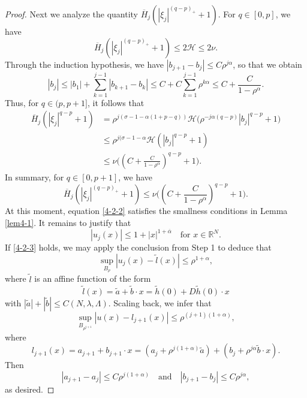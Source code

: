 \documentclass[11pt,reqno]{amsart}
\numberwithin{equation}{section}
\begin{document}
\begin{proof}
Next we analyze the quantity $\overline{H}_j(|\xi_j|^{(q-p)_+}+1)$. For $q\in[0,p]$, we have
$$
\overline{H}_j(|\xi_j|^{(q-p)_+}+1)\le2\mathcal{H}\le2\nu.
$$
Through the induction hypothesis, we have $|b_{j+1}-b_j|\le C\rho^{j\alpha}$, so that we obtain
$$
|b_j|\le |b_1|+\sum_{k=1}^{j-1}|b_{k+1}-b_k|\le C+C\sum_{k=1}^{j-1}\rho^{k\alpha}\le C+\frac{C}{1-\rho^\alpha}.
$$
Thus, for $q\in(p,p+1]$, it follows that
\begin{align*}
\overline{H}_j(|\xi_j|^{q-p}+1)&=\rho^{j(\sigma-1-\alpha(1+p-q))}\mathcal{H}\bigl(\rho^{-j\alpha(q-p)}|b_j|^{q-p}+1\bigr)\\
&\le\rho^{j(\sigma-1-\alpha}\mathcal{H}\left(|b_j|^{q-p}+1\right)\\
&\le\nu\biggl(\left(C+\frac{C}{1-\rho^\alpha}\right)^{q-p}+1\biggr).
\end{align*}
In summary, for $q\in[0,p+1]$, we have
$$
\overline{H}_j(|\xi_j|^{(q-p)_+}+1)\le\nu\biggl(\left(C+\frac{C}{1-\rho^\alpha}\right)^{q-p}+1\biggr).
$$
At this moment,  equation \eqref{4-2-2} satisfies the smallness conditions in Lemma \ref{lem4-1}. It remains to justify that
\begin{equation}
\label{4-2-3}
|u_j(x)|\le1+|x|^{1+\overline{\alpha}} \quad\text{for } x\in\mathbb{R}^N.
\end{equation}
If  \eqref{4-2-3} holds, we may apply the conclusion from Step 1 to deduce that
$$
\sup_{B_\rho}|u_j(x)-\tilde{l}(x)|\le \rho^{1+\alpha},
$$
where $\tilde{l}$ is an affine function of the form
$$
\tilde{l}(x)=\tilde{a}+\tilde{b}\cdot x=\tilde{h}(0)+D\tilde{h}(0)\cdot x
$$
with $|\tilde{a}|+|\tilde{b}|\le C(N,\lambda,\Lambda)$. Scaling back, we infer that
$$
\sup_{B_{\rho^{j+1}}}|u(x)-l_{j+1}(x)|\le \rho^{(j+1)(1+\alpha)},
$$
where
$$
l_{j+1}(x)=a_{j+1}+b_{j+1}\cdot x=(a_j+\rho^{j(1+\alpha)}\tilde{a})+(b_j+\rho^{j\alpha}\tilde{b}\cdot x).
$$
Then
$$
|a_{j+1}-a_j|\le C\rho^{j(1+\alpha)} \quad \text{and}\quad |b_{j+1}-b_j|\le C\rho^{j\alpha},
$$
as desired.


\end{proof}
\end{document}
